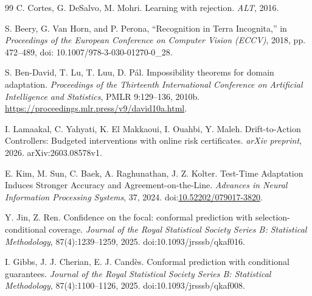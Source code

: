 \begin{thebibliography}{99}
 C. Cortes, G. DeSalvo, M. Mohri. Learning with rejection.
\emph{ALT}, 2016.

S. Beery, G. Van Horn, and P. Perona,
``Recognition in Terra Incognita,''
in \emph{Proceedings of the European Conference on Computer Vision (ECCV)},
2018, pp. 472--489, doi: 10.1007/978-3-030-01270-0\_28.

 S. Ben-David, T. Lu, T. Luu, D. P\'al.
Impossibility theorems for domain adaptation.
\emph{Proceedings of the Thirteenth International Conference on Artificial Intelligence
and Statistics}, PMLR 9:129--136, 2010b.
\url{https://proceedings.mlr.press/v9/david10a.html}.

 I. Lamaakal, C. Yahyati, K. El Makkaoui,
I. Ouahbi, Y. Maleh. Drift-to-Action Controllers: Budgeted interventions with online risk certificates.
\emph{arXiv preprint}, 2026. arXiv:2603.08578v1.

 E. Kim, M. Sun, C. Baek,
A. Raghunathan, J. Z. Kolter.
Test-Time Adaptation Induces Stronger Accuracy and Agreement-on-the-Line.
\emph{Advances in Neural Information Processing Systems}, 37, 2024.
doi:\href{https://doi.org/10.52202/079017-3820}{10.52202/079017-3820}.

 Y. Jin, Z. Ren.
Confidence on the focal: conformal prediction with selection-conditional coverage.
\emph{Journal of the Royal Statistical Society Series B: Statistical Methodology},
87(4):1239--1259, 2025. doi:10.1093/jrsssb/qkaf016.

 I. Gibbs, J. J. Cherian,
E. J. Cand\`es.
Conformal prediction with conditional guarantees.
\emph{Journal of the Royal Statistical Society Series B: Statistical Methodology},
87(4):1100--1126, 2025. doi:10.1093/jrsssb/qkaf008.


\end{thebibliography}
